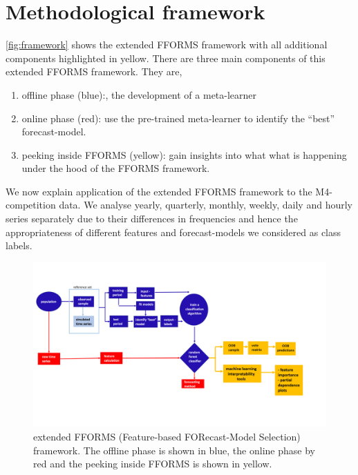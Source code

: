 \documentclass[11pt,a4paper,]{article}
\providecommand{\tightlist}{%
  \setlength{\itemsep}{0pt}\setlength{\parskip}{0pt}}
\begin{document}
\hypertarget{fforms}{%
\section{Methodological framework}\label{fforms}}

\autoref{fig:framework} shows the extended FFORMS framework with all additional components highlighted in yellow. There are three main components of this extended FFORMS framework. They are,

\begin{enumerate}
\def\labelenumi{\arabic{enumi}.}
\tightlist
\item
  offline phase (blue):, the development of a meta-learner
\item
  online phase (red): use the pre-trained meta-learner to identify the ``best'' forecast-model.
\item
  peeking inside FFORMS (yellow): gain insights into what what is happening under the hood of the FFORMS framework.
\end{enumerate}

We now explain application of the extended FFORMS framework to the M4-competition data. We analyse yearly, quarterly, monthly, weekly, daily and hourly series separately due to their differences in frequencies and hence the appropriateness of different features and forecast-models we considered as class labels.

\begin{figure}[h]
\includegraphics[width=1.15\linewidth]{img/framework2} \caption{extended FFORMS (Feature-based FORecast-Model Selection) framework. The offline phase is shown in blue, the online phase by red and the peeking inside FFORMS is shown in yellow.}\label{fig:framework}
\end{figure}
\end{document}
